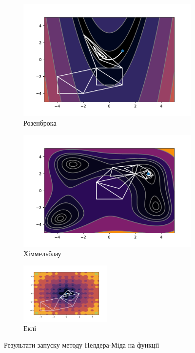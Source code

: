 \begin{figure}[h!]
    \begin{subfigure}{0.5\textwidth}
        \includegraphics[width=\textwidth, trim=1cm 0.5cm 1.3cm 1cm, clip]{assets/NelderMead/rosenbrock.pdf}
        \caption{Розенброка}
    \end{subfigure}
    \begin{subfigure}{0.5\textwidth}
        \includegraphics[width=\textwidth, trim=1cm 0.5cm 1.3cm 1cm, clip]{assets/NelderMead/himmelblau.pdf}
        \caption{Хіммельблау}
    \end{subfigure}
    \begin{subfigure}{\textwidth}
        \centering
        \includegraphics[width=0.5\textwidth, trim=1cm 0.5cm 1.3cm 1cm, clip]{assets/NelderMead/ackley.pdf}
        \caption{Еклі}
    \end{subfigure}
    \caption{Результати запуску методу Нелдера-Міда на функції}
\end{figure}

